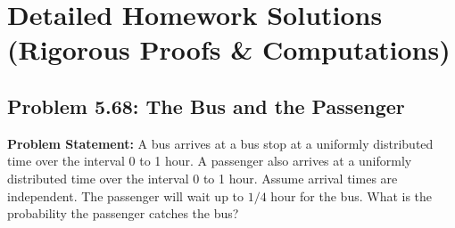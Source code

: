 \documentclass[11pt, a4paper]{article}
\theoremstyle{definition}
\theoremstyle{remark}
\begin{document}
\section{Detailed Homework Solutions (Rigorous Proofs \& Computations)}

\subsection{Problem 5.68: The Bus and the Passenger}
\textbf{Problem Statement:} A bus arrives at a bus stop at a uniformly distributed time over the interval 0 to 1 hour. A passenger also arrives at a uniformly distributed time over the interval 0 to 1 hour. Assume arrival times are independent. The passenger will wait up to $1/4$ hour for the bus. What is the probability the passenger catches the bus?
\end{document}
